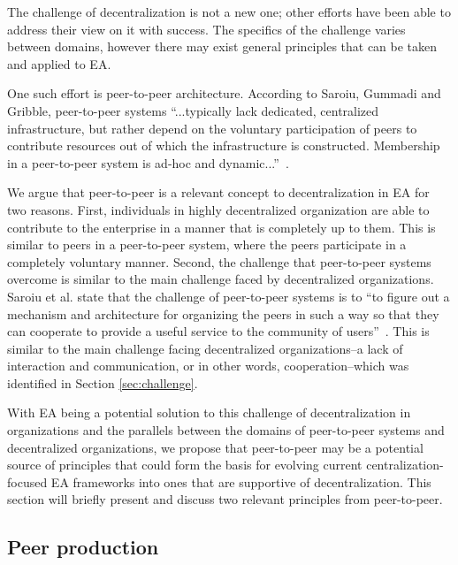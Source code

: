 The challenge of decentralization is not a new one; other efforts have been able to address their view on it with success. The specifics of the challenge varies between domains, however there may exist general principles that can be taken and applied to EA. 

One such effort is peer-to-peer architecture. According to Saroiu, Gummadi and Gribble, peer-to-peer systems ``...typically lack dedicated, centralized infrastructure, but rather depend on the voluntary participation of peers to contribute resources out of which the infrastructure is constructed. Membership in a peer-to-peer system is ad-hoc and dynamic...''~\cite{saroiu2001measurement}. 


We argue that peer-to-peer is a relevant concept to decentralization in EA for two reasons. First, individuals in highly decentralized organization are able to contribute to the enterprise in a manner that is completely up to them. This is similar to peers in a peer-to-peer system, where the peers participate in a completely voluntary manner. Second, the challenge that peer-to-peer systems overcome is similar to the main challenge faced by decentralized organizations. Saroiu et al. state that the challenge of peer-to-peer systems is to ``to figure out a mechanism and architecture for organizing the peers in such a way so that they can cooperate to provide a useful service to the community of users''~\cite{saroiu2001measurement}. This is similar to the main challenge facing decentralized organizations--a lack of interaction and communication, or in other words, cooperation--which was identified in Section \ref{sec:challenge}. 

With EA being a potential solution to this challenge of decentralization in organizations and the parallels between the domains of peer-to-peer systems and decentralized organizations, we propose that peer-to-peer may be a potential source of principles that could form the basis for evolving current centralization-focused EA frameworks into ones that are supportive of decentralization. This section will briefly present and discuss two relevant principles from peer-to-peer.

%
%

\subsection{Peer production}


